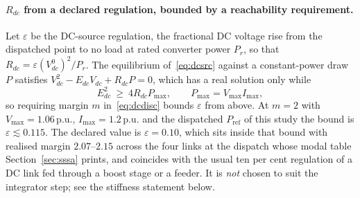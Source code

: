 \documentclass[12pt,a4paper]{article}
\theoremstyle{remark}
\newcommand{\pu}{\,\mathrm{p.u.}}
\begin{document}
\paragraph{$R_{dc}$ from a declared regulation, bounded by a reachability
requirement.} Let $\varepsilon$ be the DC-source regulation, the fractional DC
voltage rise from the dispatched point to no load at rated converter power
$P_r$, so that $R_{dc}=\varepsilon (V_{dc}^{0})^{2}/P_r$. The equilibrium
of~\eqref{eq:dcsrc} against a constant-power draw $P$ satisfies
$V_{dc}^{2}-E_{dc}V_{dc}+R_{dc}P=0$, which has a real solution only while
\begin{equation}
  E_{dc}^{2}\ \ge\ 4R_{dc}P_{\max},\qquad P_{\max}=V_{\max}I_{\max},
  \label{eq:dcdisc}
\end{equation}
so requiring margin $m$ in~\eqref{eq:dcdisc} bounds $\varepsilon$ from above. At
$m=2$ with $V_{\max}=1.06\pu$, $I_{\max}=1.2\pu$ and the dispatched
$P_{\mathrm{ref}}$ of this study the bound is $\varepsilon\lesssim0.115$. The
declared value is $\varepsilon=0.10$, which sits inside that bound with realised
margin $2.07$--$2.15$ across the four links at the dispatch whose modal table
Section~\ref{sec:sssa} prints, and coincides with the usual ten per cent
regulation of a DC link fed through a boost stage or a feeder. It is \emph{not} chosen to suit the
integrator step; see the stiffness statement below.
\end{document}
